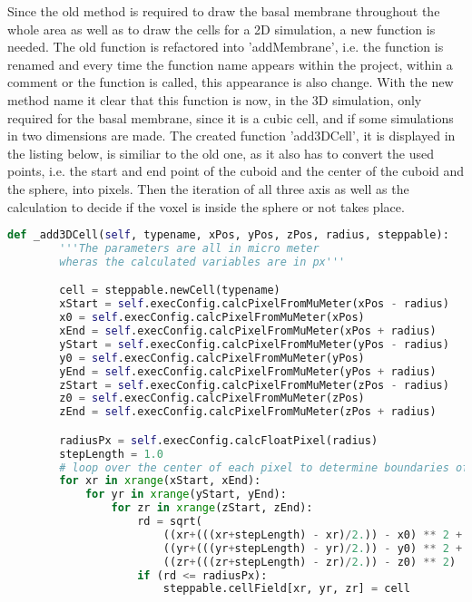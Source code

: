 Since the old method is required to draw the basal membrane throughout the whole area as well as to draw the cells for a 2D simulation, a new function is needed. The old function is refactored into 'addMembrane', i.e. the function is renamed and every time the function name appears within the project, within a comment or the function is called, this appearance is also change. With the new method name it clear that this function is now, in the 3D simulation, only required for the basal membrane, since it is a cubic cell, and if some simulations in two dimensions are made.\newline
The created function 'add3DCell', it is displayed in the listing below, is similiar to the old one, as it also has to convert the used points, i.e. the start and end point of the cuboid and the center of the cuboid and the sphere, into pixels. Then the iteration of all three axis as well as the calculation to decide if the voxel is inside the sphere or not takes place.

\begin{lstlisting}[language=Python, caption = created method to draw a spere cell]
    def _add3DCell(self, typename, xPos, yPos, zPos, radius, steppable):
        '''The parameters are all in micro meter
        wheras the calculated variables are in px'''

        cell = steppable.newCell(typename)
        xStart = self.execConfig.calcPixelFromMuMeter(xPos - radius)
        x0 = self.execConfig.calcPixelFromMuMeter(xPos)
        xEnd = self.execConfig.calcPixelFromMuMeter(xPos + radius)
        yStart = self.execConfig.calcPixelFromMuMeter(yPos - radius)
        y0 = self.execConfig.calcPixelFromMuMeter(yPos)
        yEnd = self.execConfig.calcPixelFromMuMeter(yPos + radius)
        zStart = self.execConfig.calcPixelFromMuMeter(zPos - radius)
        z0 = self.execConfig.calcPixelFromMuMeter(zPos)
        zEnd = self.execConfig.calcPixelFromMuMeter(zPos + radius)

        radiusPx = self.execConfig.calcFloatPixel(radius)
        stepLength = 1.0
        # loop over the center of each pixel to determine boundaries of the circle
        for xr in xrange(xStart, xEnd):
            for yr in xrange(yStart, yEnd):
                for zr in xrange(zStart, zEnd):
                    rd = sqrt(
                        ((xr+(((xr+stepLength) - xr)/2.)) - x0) ** 2 +
                        ((yr+(((yr+stepLength) - yr)/2.)) - y0) ** 2 +
                        ((zr+(((zr+stepLength) - zr)/2.)) - z0) ** 2)
                    if (rd <= radiusPx):
                        steppable.cellField[xr, yr, zr] = cell
\end{lstlisting}


